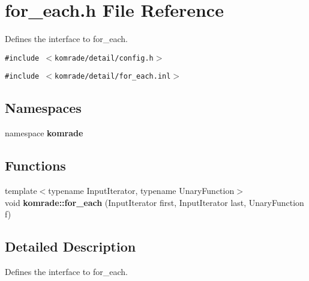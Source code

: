 \section{for\_\-each.h File Reference}
\label{for__each_8h}
Defines the interface to for\_\-each. 

{\tt \#include $<$komrade/detail/config.h$>$}\par
{\tt \#include $<$komrade/detail/for\_\-each.inl$>$}\par
\subsection*{Namespaces}
\begin{CompactItemize}
\item 
namespace {\bf komrade}
\end{CompactItemize}
\subsection*{Functions}
\begin{CompactItemize}
\item 
{\footnotesize template$<$typename InputIterator, typename UnaryFunction$>$ }\\void {\bf komrade::for\_\-each} (InputIterator first, InputIterator last, UnaryFunction f)
\end{CompactItemize}


\subsection{Detailed Description}
Defines the interface to for\_\-each. 

